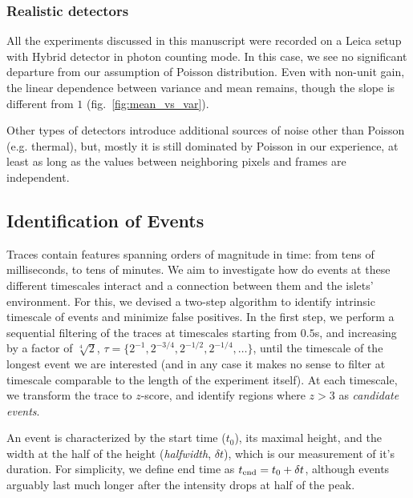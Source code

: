 \documentclass[a4paper,11pt,oneside,]{article}
\begin{document}
\subsubsection{Realistic detectors}
All the experiments discussed in this manuscript were recorded on a Leica setup with Hybrid detector in photon counting mode.
In this case, we see no significant departure from our assumption of Poisson distribution.
Even with non-unit gain, the linear dependence between variance and mean remains, though the slope is different from $1$ (fig.~\ref{fig:mean_vs_var}).

Other types of detectors introduce additional sources of noise other than Poisson (e.g. thermal), but, mostly it is still dominated by Poisson in our experience, at least as long as the values between neighboring pixels and frames are independent.


\subsection{Identification of Events}

Traces contain features spanning orders of magnitude in time: from tens of milliseconds, to tens of minutes. 
We aim to investigate how do events at these different timescales interact and a connection between them and the islets' environment.
For this, we devised a two-step algorithm to identify intrinsic timescale of events and minimize false positives.
In the first step, we perform a sequential filtering of the traces at timescales starting from $0.5$s, and increasing by a factor of $\sqrt[4]{2}$,  $\tau = \{2^{-1}, 2^{-3/4}, 2^{-1/2}, 2^{-1/4},\dots\}$, until the timescale of the longest event we are interested (and in any case it makes no sense to filter at timescale comparable to the length of the experiment itself).
At each timescale, we transform the trace to $z$-score, and identify regions where $z>3$ as {\it candidate events}. 

An event is characterized by the start time ($t_0$), its maximal height, and the width at the half of the height ({\it halfwidth}, $\delta t$), which is our measurement of it's duration.
For simplicity, we define end time as $t_{\rm end} = t_0+\delta t$, although events arguably last much longer after the intensity drops at half of the peak.
\end{document}
